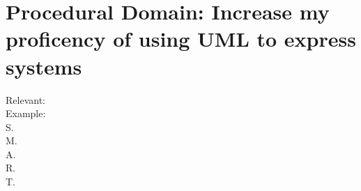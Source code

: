 \documentclass{scrartcl}
\begin{document}
\section{Procedural Domain: Increase my proficency of using UML to express systems}
Relevant: \\
Example: \\
S.\\
M.\\
A.\\
R.\\
T. \\




\end{document}
